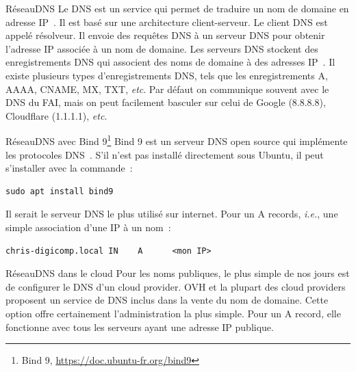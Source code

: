 \documentclass{beamer}
\begin{document}
    \begin{frame}{Réseau}{DNS}
        Le DNS est un service qui permet de traduire un nom de domaine en adresse IP~.
        Il est basé sur une architecture client-serveur.
        \bigbreak
        Le client DNS est appelé résolveur.
        Il envoie des requêtes DNS à un serveur DNS pour obtenir l'adresse IP associée à un nom de domaine.
        \bigbreak
        Les serveurs DNS stockent des enregistrements DNS qui associent des noms de domaine à des adresses IP~.
        Il existe plusieurs types d'enregistrements DNS, tels que les enregistrements A, AAAA, CNAME, MX, TXT, \textit{etc}.
        \bigbreak
        Par défaut on communique souvent avec le DNS du FAI, mais on peut facilement basculer sur celui de Google (8.8.8.8), Cloudflare (1.1.1.1), \textit{etc}.
    \end{frame}

    \begin{frame}[fragile]{Réseau}{DNS avec Bind 9\footnote{Bind 9, \url{https://doc.ubuntu-fr.org/bind9}}}
        Bind 9 est un serveur DNS open source qui implémente les protocoles DNS~.
        S'il n'est pas installé directement sous Ubuntu, il peut s'installer avec la commande~:
        \begin{lstlisting}
sudo apt install bind9
        \end{lstlisting}
        Il serait le serveur DNS le plus utilisé sur internet.
        \bigbreak
        Pour un A records, \textit{i.e.}, une simple association d'une IP à un nom~:
        \begin{lstlisting}
chris-digicomp.local IN    A      <mon IP>
        \end{lstlisting}
    \end{frame}

    \begin{frame}{Réseau}{DNS dans le cloud}
        Pour les noms publiques, le plus simple de nos jours est de configurer le DNS d'un cloud provider.
        \bigbreak
        OVH et la plupart des cloud providers proposent un service de DNS inclus dans la vente du nom de domaine.
        \bigbreak
        Cette option offre certainement l'administration la plus simple.
        Pour un A record, elle fonctionne avec tous les serveurs ayant une adresse IP publique.
    \end{frame}
\end{document}
